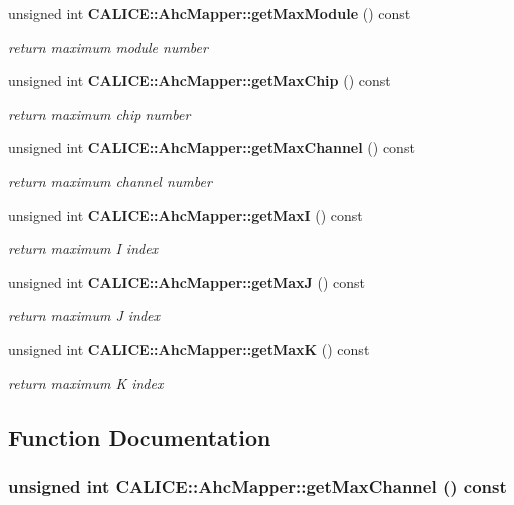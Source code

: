 \begin{DoxyCompactItemize}
unsigned int {\bf CALICE::AhcMapper::getMaxModule} () const 
\begin{DoxyCompactList}\small\item\em return maximum module number \item\end{DoxyCompactList}\item 
unsigned int {\bf CALICE::AhcMapper::getMaxChip} () const 
\begin{DoxyCompactList}\small\item\em return maximum chip number \item\end{DoxyCompactList}\item 
unsigned int {\bf CALICE::AhcMapper::getMaxChannel} () const 
\begin{DoxyCompactList}\small\item\em return maximum channel number \item\end{DoxyCompactList}\item 
unsigned int {\bf CALICE::AhcMapper::getMaxI} () const 
\begin{DoxyCompactList}\small\item\em return maximum I index \item\end{DoxyCompactList}\item 
unsigned int {\bf CALICE::AhcMapper::getMaxJ} () const 
\begin{DoxyCompactList}\small\item\em return maximum J index \item\end{DoxyCompactList}\item 
unsigned int {\bf CALICE::AhcMapper::getMaxK} () const 
\begin{DoxyCompactList}\small\item\em return maximum K index \item\end{DoxyCompactList}\end{DoxyCompactItemize}


\subsection{Function Documentation}
\subsubsection[{getMaxChannel}]{\setlength{\rightskip}{0pt plus 5cm}unsigned int CALICE::AhcMapper::getMaxChannel () const\hspace{0.3cm}{\ttfamily  [inline, inherited]}}\label{group__Range_gaf8ac2bae917fc0756a3518345655fbd4}


